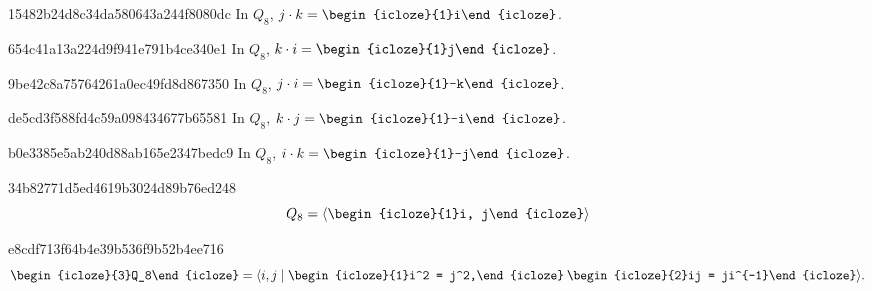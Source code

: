 \begin{note}{15482b24d8c34da580643a244f8080dc}
    In \({ Q_8 }\), \quad
    \({ j \cdot k = \begin{icloze}{1}i\end{icloze} }\).
\end{note}

\begin{note}{654c41a13a224d9f941e791b4ce340e1}
    In \({ Q_8 }\), \quad
    \({ k \cdot i = \begin{icloze}{1}j\end{icloze} }\).
\end{note}

\begin{note}{9be42c8a75764261a0ec49fd8d867350}
    In \({ Q_8 }\), \quad
    \({ j \cdot i = \begin{icloze}{1}-k\end{icloze} }\).
\end{note}

\begin{note}{de5cd3f588fd4c59a098434677b65581}
    In \({ Q_8 }\), \quad
    \({ k \cdot j = \begin{icloze}{1}-i\end{icloze} }\).
\end{note}

\begin{note}{b0e3385e5ab240d88ab165e2347bedc9}
    In \({ Q_8 }\), \quad
    \({ i \cdot k = \begin{icloze}{1}-j\end{icloze} }\).
\end{note}

\begin{note}{34b82771d5ed4619b3024d89b76ed248}
    \[
        Q_8 = \langle \begin{icloze}{1}i, j\end{icloze} \rangle
    \]
\end{note}

\begin{note}{e8cdf713f64b4e39b536f9b52b4ee716}
    \[
        \begin{icloze}{3}Q_8\end{icloze} = \langle i, j \mid \begin{icloze}{1}i^2 = j^2,\end{icloze}\: \begin{icloze}{2}ij = ji^{-1}\end{icloze} \rangle.
    \]
\end{note}

